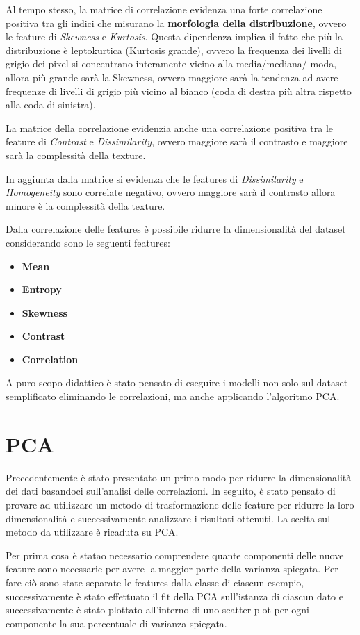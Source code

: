 Al tempo stesso, la matrice di correlazione evidenza una forte correlazione positiva
tra gli indici che misurano la \textbf{morfologia della distribuzione}, ovvero
le feature di \textit{Skewness} e \textit{Kurtosis}. Questa dipendenza implica il
fatto che più la distribuzione è leptokurtica (Kurtosis grande), ovvero la frequenza
dei livelli di grigio dei pixel si concentrano interamente vicino alla media/mediana/
moda, allora più grande sarà la Skewness, ovvero maggiore sarà la tendenza ad avere
frequenze di livelli di grigio più vicino al bianco (coda di destra più altra rispetto
alla coda di sinistra).

La matrice della correlazione evidenzia anche una correlazione positiva tra le
feature di \textit{Contrast} e \textit{Dissimilarity}, ovvero maggiore sarà il
contrasto e maggiore sarà la complessità della texture.

In aggiunta dalla matrice si evidenza che le features di \textit{Dissimilarity}
e \textit{Homogeneity} sono correlate negativo, ovvero maggiore sarà il contrasto
allora minore è la complessità della texture.

Dalla correlazione delle features è possibile ridurre la dimensionalità del dataset
considerando sono le seguenti features:
\begin{itemize}
    \item \textbf{Mean}
    \item \textbf{Entropy}
    \item \textbf{Skewness}
    \item \textbf{Contrast}
    \item \textbf{Correlation}
\end{itemize}
A puro scopo didattico è stato pensato di eseguire i modelli non solo sul dataset
semplificato eliminando le correlazioni, ma anche applicando l'algoritmo PCA.

\section{PCA}
Precedentemente è stato presentato un primo modo per ridurre la dimensionalità
dei dati basandoci sull'analisi delle correlazioni. In seguito, è stato pensato
di provare ad utilizzare un metodo di trasformazione delle feature per ridurre
la loro dimensionalità e successivamente analizzare i risultati ottenuti. La 
scelta sul metodo da utilizzare è ricaduta su PCA.

Per prima cosa è statao necessario comprendere quante componenti delle nuove
feature sono necessarie per avere la maggior parte della varianza spiegata. Per 
fare ciò sono state separate le features dalla classe di ciascun esempio,
successivamente è stato effettuato il fit della PCA sull'istanza di ciascun dato
e successivamente è stato plottato all'interno di uno scatter plot per ogni 
componente la sua percentuale di varianza spiegata.

